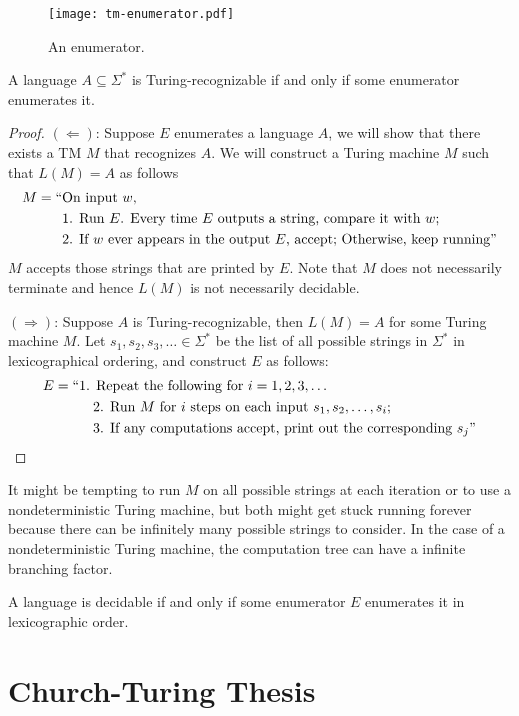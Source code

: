 \begin{figure}[htbp]
    \centering
    \texttt{[image: tm-enumerator.pdf]}
    \caption{An enumerator.}
    \label{fig:tm-enumerator}
\end{figure}

\begin{theorem}
    A language $A \subseteq \Sigma^*$ is Turing-recognizable if and only if some enumerator enumerates it.
\end{theorem}

\begin{proof}
    \hfill

    $(\Leftarrow)$: Suppose $E$ enumerates a language $A$, we will show that there exists a TM $M$ that recognizes $A$. We will construct a Turing machine $M$ such that $L(M)=A$ as follows
    $$
    \begin{aligned}
        M = ``&\text{On input $w$,} \\
        & \text{1. Run $E$. Every time $E$ outputs a string, compare it with $w$;} \\
        & \text{2. If $w$ ever appears in the output $E$, accept; Otherwise, keep running} "
    \end{aligned}
    $$
    $M$ accepts those strings that are printed by $E$. Note that $M$ does not necessarily terminate and hence $L(M)$ is not necessarily decidable.

    $(\Rightarrow)$: Suppose $A$ is Turing-recognizable, then $L(M)=A$ for some Turing machine $M$. Let $s_1,s_2,s_3,\ldots \in \Sigma^*$ be the list of all possible strings in $\Sigma^*$ in lexicographical ordering, and construct $E$ as follows:
    $$
    \begin{aligned}
        E = ``& \text{1. Repeat the following for $i=1,2,3,\ldots$} \\
        &\quad \text{2. Run $M$ for $i$ steps on each input $s_1,s_2,\ldots,s_i$;} \\
        &\quad \text{3. If any computations accept, print out the corresponding $s_j$}"
    \end{aligned}
    $$
\end{proof}

It might be tempting to run $M$ on all possible strings at each iteration or to use a nondeterministic Turing machine, but both might get stuck running forever because there can be infinitely many possible strings to consider. In the case of a nondeterministic Turing machine, the computation tree can have a infinite branching factor.

\begin{theorem}
    A language is decidable if and only if some enumerator $E$ enumerates it in lexicographic order.
\end{theorem}

\section{Church-Turing Thesis}